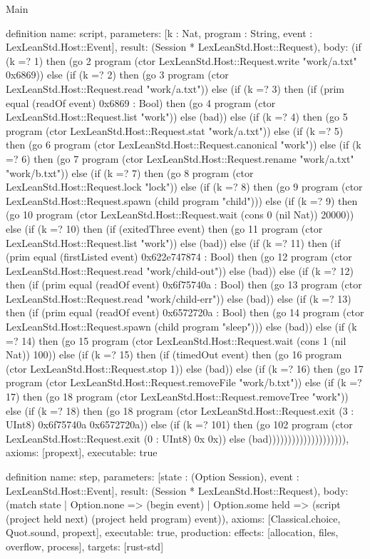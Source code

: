 \begin{lexlean}{Main}
\begin{semanticmodule}
definition{
  name: script,
  parameters: [k : Nat, program : String, event : LexLeanStd.Host::Event],
  result: (Session * LexLeanStd.Host::Request),
  body: (if (k =? 1) then (go 2 program (ctor LexLeanStd.Host::Request.write "work/a.txt" 0x6869)) else (if (k =? 2) then (go 3 program (ctor LexLeanStd.Host::Request.read "work/a.txt")) else (if (k =? 3) then (if (prim equal (readOf event) 0x6869 : Bool) then (go 4 program (ctor LexLeanStd.Host::Request.list "work")) else (bad)) else (if (k =? 4) then (go 5 program (ctor LexLeanStd.Host::Request.stat "work/a.txt")) else (if (k =? 5) then (go 6 program (ctor LexLeanStd.Host::Request.canonical "work")) else (if (k =? 6) then (go 7 program (ctor LexLeanStd.Host::Request.rename "work/a.txt" "work/b.txt")) else (if (k =? 7) then (go 8 program (ctor LexLeanStd.Host::Request.lock "lock")) else (if (k =? 8) then (go 9 program (ctor LexLeanStd.Host::Request.spawn (child program "child"))) else (if (k =? 9) then (go 10 program (ctor LexLeanStd.Host::Request.wait (cons 0 (nil Nat)) 20000)) else (if (k =? 10) then (if (exitedThree event) then (go 11 program (ctor LexLeanStd.Host::Request.list "work")) else (bad)) else (if (k =? 11) then (if (prim equal (firstListed event) 0x622e747874 : Bool) then (go 12 program (ctor LexLeanStd.Host::Request.read "work/child-out")) else (bad)) else (if (k =? 12) then (if (prim equal (readOf event) 0x6f75740a : Bool) then (go 13 program (ctor LexLeanStd.Host::Request.read "work/child-err")) else (bad)) else (if (k =? 13) then (if (prim equal (readOf event) 0x6572720a : Bool) then (go 14 program (ctor LexLeanStd.Host::Request.spawn (child program "sleep"))) else (bad)) else (if (k =? 14) then (go 15 program (ctor LexLeanStd.Host::Request.wait (cons 1 (nil Nat)) 100)) else (if (k =? 15) then (if (timedOut event) then (go 16 program (ctor LexLeanStd.Host::Request.stop 1)) else (bad)) else (if (k =? 16) then (go 17 program (ctor LexLeanStd.Host::Request.removeFile "work/b.txt")) else (if (k =? 17) then (go 18 program (ctor LexLeanStd.Host::Request.removeTree "work")) else (if (k =? 18) then (go 18 program (ctor LexLeanStd.Host::Request.exit (3 : UInt8) 0x6f75740a 0x6572720a)) else (if (k =? 101) then (go 102 program (ctor LexLeanStd.Host::Request.exit (0 : UInt8) 0x 0x)) else (bad)))))))))))))))))))),
  axioms: [propext],
  executable: true
}

definition{
  name: step,
  parameters: [state : (Option Session), event : LexLeanStd.Host::Event],
  result: (Session * LexLeanStd.Host::Request),
  body: (match state
    | Option.none => (begin event)
    | Option.some held => (script (project held next) (project held program) event)),
  axioms: [Classical.choice, Quot.sound, propext],
  executable: true,
  production: {effects: [allocation, files, overflow, process], targets: [rust-std]}
}
\end{semanticmodule}
\end{lexlean}
